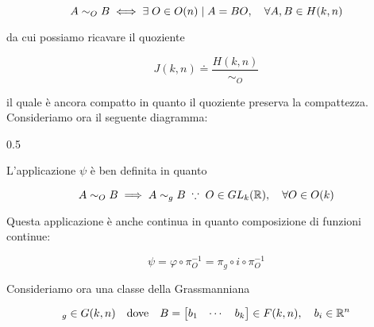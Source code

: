 {\begin{equation}
	A \sim_{O} B \iff \E O \in O(n) \mid A = B O \qcomma \forall A, B \in H(k,n)
\end{equation}

da cui possiamo ricavare il quoziente

\begin{equation}
	J(k,n) \doteq \dfrac{H(k,n)}{\sim_{O}}
\end{equation}

il quale è ancora compatto in quanto il quoziente preserva la compattezza. \\
Consideriamo ora il seguente diagramma:

	{0.5}{%
			}

L'applicazione $ \psi $ è ben definita in quanto

\begin{equation}
	A \sim_{O} B \implies A \sim_{g} B %
	\; \because \; %
	O \in GL_{k}(\R) \qcomma \forall O \in O(k)
\end{equation}

Questa applicazione è anche continua in quanto composizione di funzioni continue:

\begin{equation}
	\psi = \varphi \circ \pi_{O}^{-1} = \pi_{g} \circ i \circ \pi_{O}^{-1}
\end{equation}

Consideriamo ora una classe della Grassmanniana

\begin{equation}
	[B]_{g} \in G(k,n) \qq{dove} B = \bmqty{ b_{1} & \cdots & b_{k} } \in F(k,n) \qcomma b_{i} \in \R^{n}
\end{equation}

}
